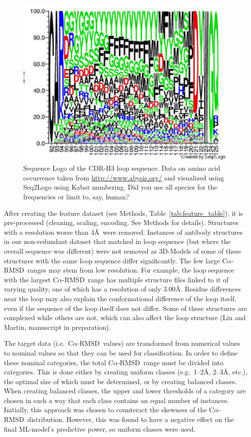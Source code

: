 \documentclass[12pt]{article}
\newcommand{\carmsd}{\mbox{C$\alpha$-RMSD}}
\newcommand{\lilian}[1]{ {\color{red}{\bfseries Lilian:} #1}}
\begin{document}
\begin{figure}
  \centering
  \includegraphics[width=\linewidth]{logo.eps}
  \caption {Sequence Logo of the CDR-H3 loop sequence. Data on amino
    acid occurrence taken from \protect\url{http://www.abysis.org/} and visualized
    using Seq2Logo using Kabat numbering.
    \lilian{Did you use all species for the frequencies or limit to, say, human?}}
  \label{fig:logo}
\end{figure}

After creating the feature dataset (see Methods, Table~\ref{tab:feature_table}), it is pre-processed (cleaning,
scaling, encoding. See Methods for details). Structures with a
resolution worse than 4\AA\ were removed.
Instances of antibody structures in our non-redundant dataset that matched in loop sequence (but where the overall sequence was different) were
not removed as 3D-Models of some of these structures with the same loop
sequence differ significantly. 
The few large \carmsd\ ranges may stem from
low resolution. For example, the loop sequence with the largest \carmsd\ range 
has multiple structure files linked to it of varying quality, one of which has a resolution of only 3.00\AA. Residue differences near the loop may also
explain the conformational difference of the loop itself, 
even if the sequence of the loop itself does not differ. Some of these structures are
complexed while others are not, which can also affect the loop
structure (Liu and Martin, manuscript in preparation).


The target data (i.e.\ \carmsd\ values) are transformed from numerical
values to nominal values so that they can be used for
classification. In order to define these nominal categories, the total
\carmsd\ range must be divided into categories. This is done either by
creating uniform classes (e.g.\ 1--2\AA, 2--3\AA, etc.), the optimal size of which
must be determined, or by creating balanced classes. When
creating balanced classes, the upper and lower thresholds of a
category are chosen in such a way that each class contains an equal
number of instances. Initially, this approach was chosen to counteract the
skewness of the \carmsd\ distribution. However, this was found to
have a negative effect on the final ML-model's predictive power, so
uniform classes were used.
\end{document}
